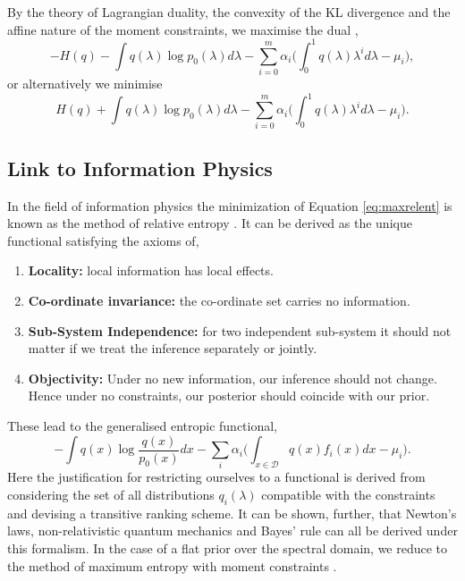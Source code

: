 \documentclass[letterpaper]{article} %
\begin{document}
By the theory of Lagrangian duality, the convexity of the KL divergence and the affine nature of the moment constraints, we maximise the dual \cite{boyd_vandenberghe_2009},
\begin{equation}
-H(q) - \int q(\lambda)\log p_{0}(\lambda)d\lambda - \sum_{i=0}^{m}\alpha_{i}\biggl(\int_{0}^{1}q(\lambda)\lambda^{i}d\lambda - \mu_{i}\biggr),
\end{equation}
or alternatively we minimise
\begin{equation}
\label{eq:maxrelent}
H(q) + \int q(\lambda)\log p_{0}(\lambda)d\lambda - \sum_{i=0}^{m}\alpha_{i}\biggl(\int_{0}^{1}q(\lambda)\lambda^{i}d\lambda - \mu_{i}\biggr).
\end{equation}

\subsection{Link to Information Physics}
In the field of information physics the minimization of Equation \eqref{eq:maxrelent} is known as the method of relative entropy \cite{caticha2012entropic}. It can be derived as the unique functional satisfying the axioms of,
\begin{enumerate}
	\item {\bfseries Locality:} local information has local effects.
	\item {\bfseries Co-ordinate invariance:} the co-ordinate set carries no information.
	\item {\bfseries Sub-System Independence:} for two independent sub-system it should not matter if we treat the inference separately or jointly.
	\item {\bfseries Objectivity:} Under no new information, our inference should not change. Hence under no constraints, our posterior should coincide with our prior.
\end{enumerate}
These lead to the generalised entropic functional,
\begin{equation}
-\int q(x)\log\frac{q(x)}{p_{0}(x)}dx - \sum_{i}\alpha_{i}\bigg(\int_{x\in \mathcal{D}}q(x)f_{i}(x)dx-\mu_{i}\bigg).
\end{equation}
Here the justification for restricting ourselves to a functional is derived from considering the set of all distributions $q_{i}(\lambda)$ compatible with the constraints and devising a transitive ranking scheme.  It can be shown, further, that Newton's laws, non-relativistic quantum mechanics and Bayes' rule can all be derived under this formalism. In the case of a flat prior over the spectral domain, we reduce to the method of maximum entropy with moment constraints \cite{jaynes1982rationale,inftheoryjaynes}.  
\end{document}
